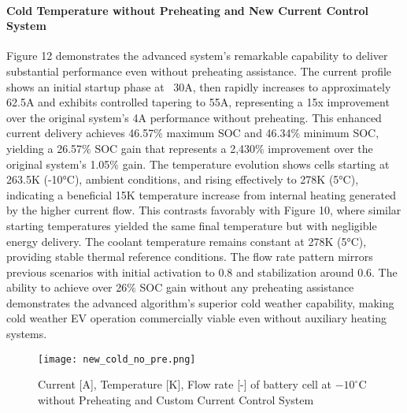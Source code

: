 \documentclass[conference]{IEEEtran}
\begin{document}
\paragraph{\textbf{ Cold Temperature without Preheating and New Current Control System}}

Figure 12 demonstrates the advanced system's remarkable capability to deliver substantial performance even without preheating assistance. The current profile shows an initial startup phase at ~30A, then rapidly increases to approximately 62.5A and exhibits controlled tapering to 55A, representing a 15x improvement over the original system's 4A performance without preheating. This enhanced current delivery achieves 46.57$\%$ maximum SOC and 46.34$\%$ minimum SOC, yielding a 26.57$\%$ SOC gain that represents a 2,430$\%$ improvement over the original system's 1.05$\%$ gain.
The temperature evolution shows cells starting at 263.5K (-10°C), ambient conditions, and rising effectively to 278K (5°C), indicating a beneficial 15K temperature increase from internal heating generated by the higher current flow. This contrasts favorably with Figure 10, where similar starting temperatures yielded the same final temperature but with negligible energy delivery. The coolant temperature remains constant at 278K (5°C), providing stable thermal reference conditions.
The flow rate pattern mirrors previous scenarios with initial activation to 0.8 and stabilization around 0.6. The ability to achieve over 26$\%$ SOC gain without any preheating assistance demonstrates the advanced algorithm's superior cold weather capability, making cold weather EV operation commercially viable even without auxiliary heating systems.

\begin{figure}[H]
    \centering
    \texttt{[image: new\_cold\_no\_pre.png]}
    \caption{Current [A], Temperature [K], Flow rate [-] of battery cell at $-10^\circ$C without Preheating and Custom Current Control System }
    \label{fig:enter-label}
\end{figure}
\end{document}
